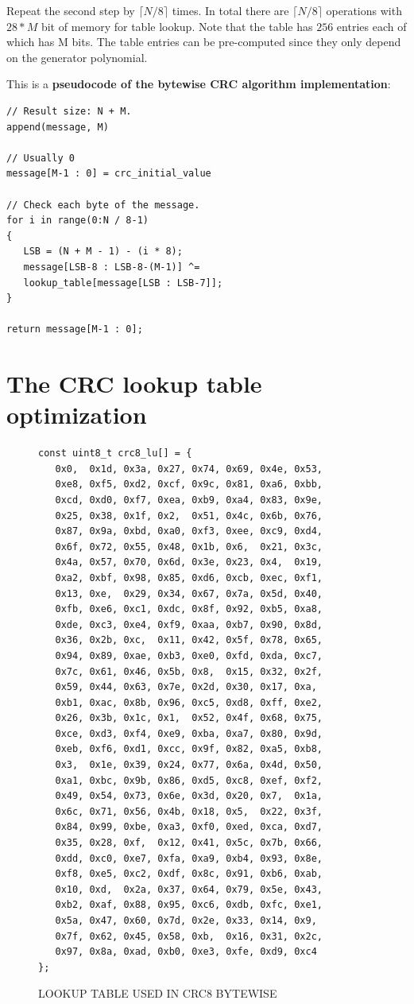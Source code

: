 \documentclass[fleqn]{IEEEtran}
\begin{document}
Repeat the second step by $\lceil{}N/8\rceil$ times. In total 
there are $\lceil{}N/8\rceil$ operations with $28*M$ bit of memory for table 
lookup. Note that the table has $256$ entries each of which has M bits. 
The table entries can be pre-computed since they only depend on the generator 
polynomial.

This is a \textbf{pseudocode of the bytewise CRC algorithm implementation}:
\begin{verbatim}
// Result size: N + M.
append(message, M)

// Usually 0
message[M-1 : 0] = crc_initial_value

// Check each byte of the message.
for i in range(0:N / 8-1) 
{
   LSB = (N + M - 1) - (i * 8);
   message[LSB-8 : LSB-8-(M-1)] ^= 
   lookup_table[message[LSB : LSB-7]];
}

return message[M-1 : 0];
\end{verbatim}


\section{The CRC lookup table optimization}
\begin{figure}[bt]
\begin{scriptsize}
\begin{verbatim}
const uint8_t crc8_lu[] = {
   0x0,  0x1d, 0x3a, 0x27, 0x74, 0x69, 0x4e, 0x53,
   0xe8, 0xf5, 0xd2, 0xcf, 0x9c, 0x81, 0xa6, 0xbb,
   0xcd, 0xd0, 0xf7, 0xea, 0xb9, 0xa4, 0x83, 0x9e,
   0x25, 0x38, 0x1f, 0x2,  0x51, 0x4c, 0x6b, 0x76,
   0x87, 0x9a, 0xbd, 0xa0, 0xf3, 0xee, 0xc9, 0xd4,
   0x6f, 0x72, 0x55, 0x48, 0x1b, 0x6,  0x21, 0x3c,
   0x4a, 0x57, 0x70, 0x6d, 0x3e, 0x23, 0x4,  0x19,
   0xa2, 0xbf, 0x98, 0x85, 0xd6, 0xcb, 0xec, 0xf1,
   0x13, 0xe,  0x29, 0x34, 0x67, 0x7a, 0x5d, 0x40,
   0xfb, 0xe6, 0xc1, 0xdc, 0x8f, 0x92, 0xb5, 0xa8,
   0xde, 0xc3, 0xe4, 0xf9, 0xaa, 0xb7, 0x90, 0x8d,
   0x36, 0x2b, 0xc,  0x11, 0x42, 0x5f, 0x78, 0x65,
   0x94, 0x89, 0xae, 0xb3, 0xe0, 0xfd, 0xda, 0xc7,
   0x7c, 0x61, 0x46, 0x5b, 0x8,  0x15, 0x32, 0x2f,
   0x59, 0x44, 0x63, 0x7e, 0x2d, 0x30, 0x17, 0xa,
   0xb1, 0xac, 0x8b, 0x96, 0xc5, 0xd8, 0xff, 0xe2,
   0x26, 0x3b, 0x1c, 0x1,  0x52, 0x4f, 0x68, 0x75,
   0xce, 0xd3, 0xf4, 0xe9, 0xba, 0xa7, 0x80, 0x9d,
   0xeb, 0xf6, 0xd1, 0xcc, 0x9f, 0x82, 0xa5, 0xb8,
   0x3,  0x1e, 0x39, 0x24, 0x77, 0x6a, 0x4d, 0x50,
   0xa1, 0xbc, 0x9b, 0x86, 0xd5, 0xc8, 0xef, 0xf2,
   0x49, 0x54, 0x73, 0x6e, 0x3d, 0x20, 0x7,  0x1a,
   0x6c, 0x71, 0x56, 0x4b, 0x18, 0x5,  0x22, 0x3f,
   0x84, 0x99, 0xbe, 0xa3, 0xf0, 0xed, 0xca, 0xd7,
   0x35, 0x28, 0xf,  0x12, 0x41, 0x5c, 0x7b, 0x66,
   0xdd, 0xc0, 0xe7, 0xfa, 0xa9, 0xb4, 0x93, 0x8e,
   0xf8, 0xe5, 0xc2, 0xdf, 0x8c, 0x91, 0xb6, 0xab,
   0x10, 0xd,  0x2a, 0x37, 0x64, 0x79, 0x5e, 0x43,
   0xb2, 0xaf, 0x88, 0x95, 0xc6, 0xdb, 0xfc, 0xe1,
   0x5a, 0x47, 0x60, 0x7d, 0x2e, 0x33, 0x14, 0x9,
   0x7f, 0x62, 0x45, 0x58, 0xb,  0x16, 0x31, 0x2c,
   0x97, 0x8a, 0xad, 0xb0, 0xe3, 0xfe, 0xd9, 0xc4
};
\end{verbatim}
\end{scriptsize}
\caption{LOOKUP TABLE USED IN CRC8 BYTEWISE}
\label{fig:LT-CRC8}
\end{figure}
\end{document}
